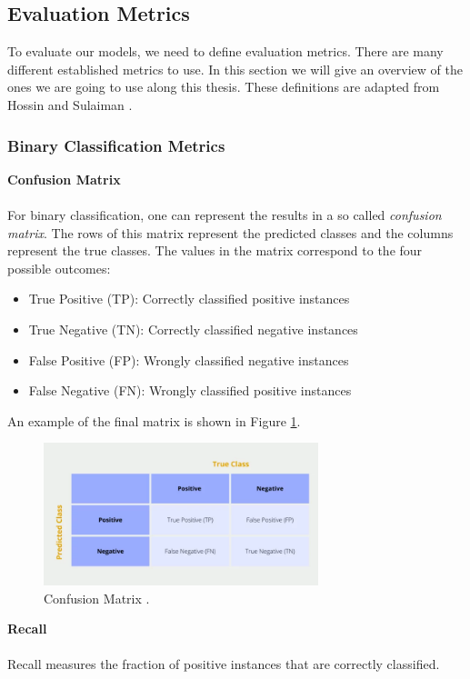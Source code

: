 \subsection{Evaluation Metrics}
To evaluate our models, we need to define evaluation metrics. There are many different established metrics to use. In this section we will give an overview of the ones we are going to use along this thesis. These definitions are adapted from Hossin and Sulaiman \cite{metrics}.

\subsubsection{Binary Classification Metrics}

\textbf{Confusion Matrix} \\ \\
For binary classification, one can represent the results in a so called \textit{confusion matrix}. The rows of this matrix represent the predicted classes and the columns represent the true classes. The values in the matrix correspond to the four possible outcomes:
\begin{itemize}
	\item[\textbullet] True Positive (TP): Correctly classified positive instances
	\item[\textbullet] True Negative (TN): Correctly classified negative instances
	\item[\textbullet] False Positive (FP): Wrongly classified negative instances
	\item[\textbullet] False Negative (FN): Wrongly classified positive instances
\end{itemize}
An example of the final matrix is shown in Figure \ref{fig:confusion-matrix}.
\begin{figure}[h]
  \centering
  \includegraphics[width=8cm]{fig/confusion_matrix.png}
  \caption{Confusion Matrix \cite{confusion}.}%
  \label{fig:confusion-matrix}
\end{figure}

\textbf{Recall} \\ \\
Recall measures the fraction of positive instances that are correctly classified.

